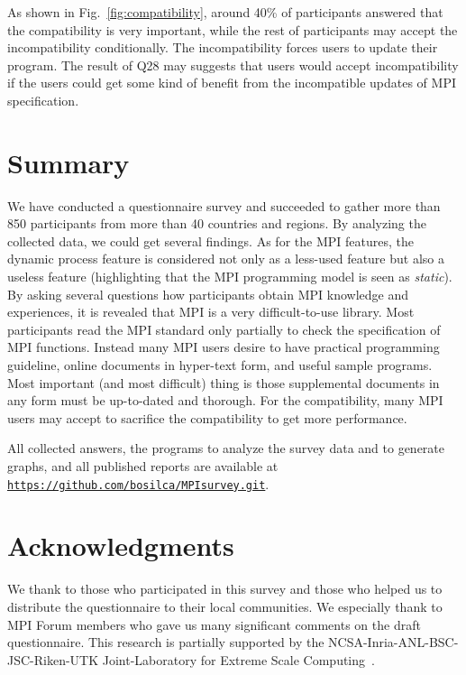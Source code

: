 \documentclass[conference,10pt,letterpaper]{IEEEtran}
\begin{document}
As shown in Fig.~\ref{fig:compatibility}, around 40\% of participants
answered that the compatibility is very important, while the rest of
participants may accept the incompatibility conditionally. The
incompatibility forces users to update their program. The result of
Q28 may suggests that users would accept incompatibility if the users
could get some kind of benefit from the incompatible updates of MPI
specification. 

\section{Summary}

We have conducted a questionnaire survey and succeeded to gather more
than 850 participants from more than 40 countries and regions. By
analyzing the collected data, we could get several findings. As for
the MPI features, the dynamic process feature is considered not only
as a less-used feature but also a useless feature (highlighting that
the MPI programming model is seen as {\em static}). By asking several
questions how participants obtain MPI knowledge and experiences, it is
revealed that MPI is a very difficult-to-use library.
Most participants read the MPI standard only partially to check the
specification of MPI functions. Instead many MPI users desire to have
practical programming guideline, online documents in
hyper-text form, and useful sample programs. Most important
(and most difficult) thing is those supplemental
documents in any form must be up-to-dated and thorough. For the
compatibility, many MPI users may accept to sacrifice the
compatibility to get more performance. 

All collected answers, the programs to analyze the survey data and to
generate graphs, and all published reports are available at
{\tt \url{https://github.com/bosilca/MPIsurvey.git}}. 

\section*{Acknowledgments}

We thank to those who participated in this survey and those who
helped us to distribute the questionnaire to their local
communities. We especially thank to MPI Forum members who gave us many
significant comments on the draft questionnaire.
This research is partially supported by the
NCSA-Inria-ANL-BSC-JSC-Riken-UTK Joint-Laboratory for Extreme Scale
Computing~\cite{JLESC}.



\end{document}
